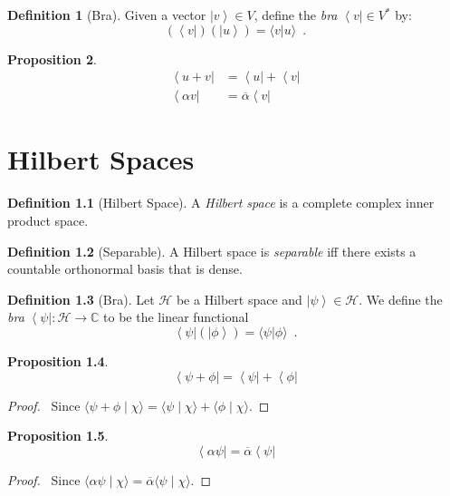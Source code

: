 \documentclass{book}
\let\qed\relax
\newtheorem{prop}{Proposition}[chapter]
\theoremstyle{definition}
\newtheorem{df}[prop]{Definition}
\newcommand{\bra}[1]{\ensuremath{\left\langle {#1} \right|}}
\newcommand{\ket}[1]{\ensuremath{\left| {#1} \right\rangle}}
\begin{document}
\begin{df}[Bra]
Given a vector $\ket{v} \in V$, define the \emph{bra} $\bra{v} \in V^*$ by:
\[ (\bra{v})(\ket{u}) = \langle v | u \rangle \enspace . \]
\end{df}

\begin{prop}
\begin{align*}
\bra{u + v} & = \bra{u} + \bra{v} \\
\bra{\alpha v} & = \overline{\alpha} \bra{v}
\end{align*}
\end{prop}


\chapter{Hilbert Spaces}

\begin{df}[Hilbert Space]
A \emph{Hilbert space} is a complete complex inner product space.
\end{df}


\begin{df}[Separable]
A Hilbert space is \emph{separable} iff there exists a countable orthonormal basis that is dense.
\end{df}

\begin{df}[Bra]
Let $\mathcal{H}$ be a Hilbert space and $\ket{\psi} \in \mathcal{H}$. We define the \emph{bra} $\bra{\psi} : \mathcal{H} \rightarrow \mathbb{C}$ to be the linear functional
\[ \bra{\psi} (\ket{\phi}) = \langle \psi | \phi \rangle \enspace . \]
\end{df}

\begin{prop}
\[ \bra{\psi + \phi} = \bra{\psi} + \bra{\phi} \]
\end{prop}

\begin{proof}
\pf\ Since $\langle \psi + \phi \mid \chi \rangle = \langle \psi \mid \chi \rangle + \langle \phi \mid \chi \rangle$. \qed
\end{proof}

\begin{prop}
\[ \bra{\alpha \psi} = \overline{\alpha} \bra{\psi} \]
\end{prop}

\begin{proof}
\pf\ Since $\langle \alpha \psi \mid \chi \rangle = \overline{\alpha} \langle \psi \mid \chi \rangle$. \qed
\end{proof}
\end{document}
